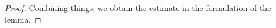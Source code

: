 \documentclass{amsart}
\theoremstyle{remark}
\renewcommand{\leq}{\leqslant}
\renewcommand{\leq}{\leqslant}
\newcommand{\e}{\mathrm{e}} %
\renewcommand{\leq}{\leqslant}%
\newcommand{\red}{\color{red}}
\begin{document}
\begin{proof}
  Combining things, we obtain the estimate in the formulation of the lemma.  
\end{proof}
\end{document}

